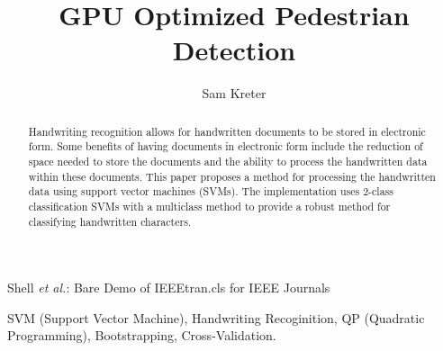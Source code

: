 \documentclass[journal]{IEEEtran}
\begin{document}
\title{GPU Optimized Pedestrian Detection}


\author{Sam Kreter}

{Shell \MakeLowercase{\textit{et al.}}: Bare Demo of IEEEtran.cls for IEEE Journals}

\maketitle

\begin{abstract}
Handwriting recognition allows for handwritten documents to be stored in electronic form. Some benefits of having documents in electronic form include the reduction of space needed to store the documents and the ability to process the handwritten data within these documents. This paper proposes a method for processing the handwritten data using support vector machines (SVMs). The implementation uses 2-class classification SVMs with a multiclass method to provide a robust method for classifying handwritten characters.
\end{abstract}

\begin{IEEEkeywords}
    SVM (Support Vector Machine), Handwriting Recoginition, QP (Quadratic Programming), Bootstrapping, Cross-Validation.
\end{IEEEkeywords}

\IEEEpeerreviewmaketitle
\end{document}
